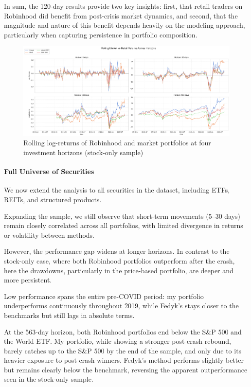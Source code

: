 In sum, the 120-day results provide two key insights: first, that retail traders on Robinhood did benefit from post-crisis market dynamics, and second, that the magnitude and nature of this benefit depends heavily on the modeling approach, particularly when capturing persistence in portfolio composition.

\begin{figure}[h!]
    \centering
    \includegraphics[width=1\linewidth]
    {../images/returns/comparison_1.png}
    \caption{Rolling log-returns of Robinhood and market portfolios at four investment horizons (stock-only sample)}
\end{figure}

\paragraph{Full Universe of Securities}

We now extend the analysis to all securities in the dataset, including ETFs, REITs, and structured products.

Expanding the sample, we still observe that short-term movements (5–30 days) remain closely correlated across all portfolios, with limited divergence in returns or volatility between methods.

However, the performance gap widens at longer horizons. 
In contrast to the stock-only case, where both Robinhood portfolios outperform after the crash, here the drawdowns, particularly in the price-based portfolio, are deeper and more persistent.

Low performance spans the entire pre-COVID period: my portfolio underperforms continuously throughout 2019, while Fedyk’s stays closer to the benchmarks but still lags in absolute terms.

At the 563-day horizon, both Robinhood portfolios end below the S\&P 500 and the World ETF.
My portfolio, while showing a stronger post-crash rebound, barely catches up to the S\&P 500 by the end of the sample, and only due to its heavier exposure to post-crash winners.
Fedyk’s method performs slightly better but remains clearly below the benchmark, reversing the apparent outperformance seen in the stock-only sample.

